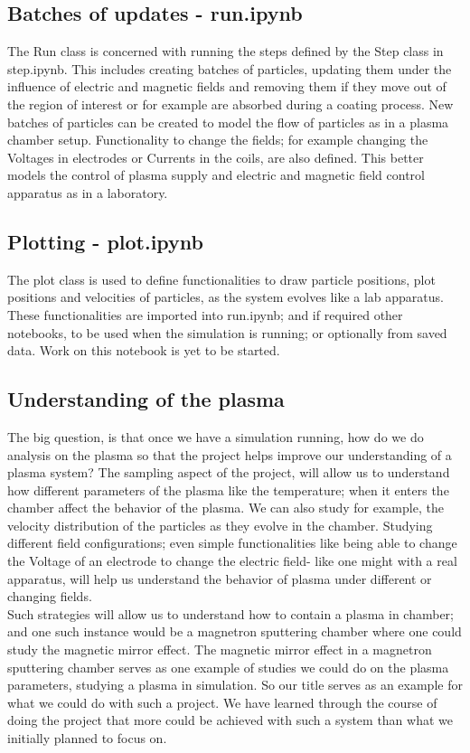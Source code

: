 \documentclass[12pt]{article}
\begin{document}
	\subsection{Batches of updates - run.ipynb}
	The Run class is concerned with running the steps defined by the Step class in step.ipynb. This includes creating batches of particles, updating them under the influence of electric and magnetic fields and removing them if they move out of the region of interest or for example are absorbed during a coating process. New batches of particles can be created to model the flow of particles as in a plasma chamber setup. Functionality to change the fields; for example changing the Voltages in electrodes or Currents in the coils, are also defined. This better models the control of plasma supply and electric and magnetic field control apparatus as in a laboratory.
	
	
	\subsection{Plotting - plot.ipynb}
	The plot class is used to define functionalities to draw particle positions, plot positions and velocities of particles, as the system evolves like a lab apparatus. These functionalities are imported into run.ipynb; and if required other notebooks, to be used when the simulation is running; or optionally from saved data. Work on this notebook is yet to be started.
	
	\subsection{Understanding of the plasma}
	The big question, is that once we have a simulation running, how do we do analysis on the plasma so that the project helps improve our understanding of a plasma system? The sampling aspect of the project, will allow us to understand how different parameters of the plasma like the temperature; when it enters the chamber affect the behavior of the plasma. We can also study for example, the velocity distribution of the particles as they evolve in the chamber. Studying different field configurations; even simple functionalities like being able to change the Voltage of an electrode to change the electric field- like one might with a real apparatus, will help us understand the behavior of plasma under different or changing fields. \\
	\noindent Such strategies will allow us to understand how to contain a plasma in chamber; and one such instance would be a magnetron sputtering chamber where one could study the magnetic mirror effect. The magnetic mirror effect in a magnetron sputtering chamber serves as one example of studies we could do on the plasma parameters, studying a plasma in simulation. So our title serves as an example for what we could do with such a project. We have learned through the course of doing the project that more could be achieved with such a system than what we initially planned to focus on. 
	
\end{document}
